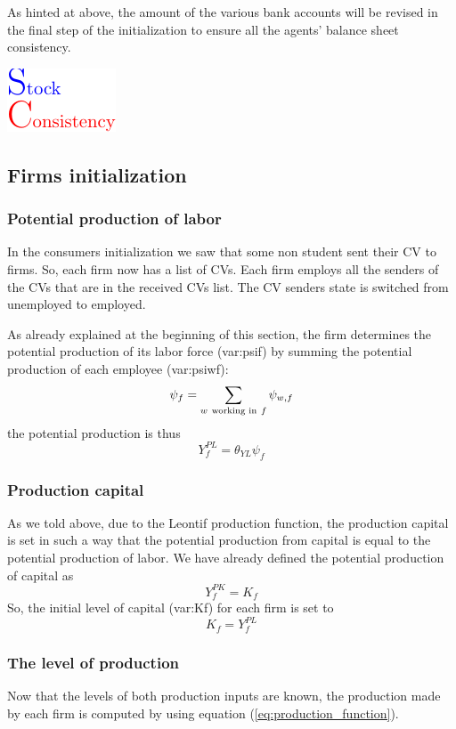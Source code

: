 \documentclass{book}
\begin{document}
As hinted at above, the amount of the various bank accounts will be revised in the final step of the initialization to ensure all the agents' balance sheet consistency.\begin{marginfigure}
	\hskip1cm\includegraphics[scale=1.0]{sc_logo-0.pdf}
\end{marginfigure}


\subsection{Firms initialization}
\subsubsection{Potential production of labor}
In the consumers initialization we saw that some non student sent their CV to firms.
So, each firm now has a list of CVs. Each firm employs all the senders of the CVs that are in the received CVs list. The CV senders state is switched from unemployed to employed.

As already explained at the beginning of this section, the firm determines the potential production of its labor force (\gls{var:psif}) by summing the potential production of each employee (\gls{var:psiwf}):
\[
	\psi_f=\sum_{w \ \textnormal{working in} \ f}\psi_{w,f}
\]
the potential production is thus
\[
	Y^{PL}_f=\theta_{YL}\psi_f
\]

\subsubsection{Production capital}
As we told above, due to the Leontif production function, the production capital is set in such a way that the potential production from capital is equal to the potential production of labor. We have already defined the potential production of capital as
\[Y_f^{PK}=K_f\]
So, the initial level of capital (\gls{var:Kf}) for each firm is set to
\[
K_f=Y^{PL}_f
\]

\subsubsection{The level of production}

Now that the levels of both production inputs are known, the production made by each firm is computed by using equation (\ref{eq:production_function}).
\end{document}
